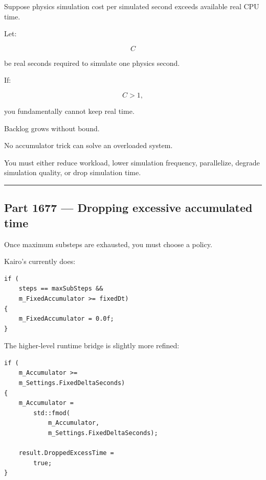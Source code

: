 \hypertarget{06-engine-ii-ch037-the-mathematical-condition}{}

Suppose physics simulation cost per simulated second exceeds available real CPU time.

Let:

\[
C
\]

be real seconds required to simulate one physics second.

If:

\[
C>1,
\]

you fundamentally cannot keep real time.

Backlog grows without bound.

No accumulator trick can solve an overloaded system.

You must either reduce workload, lower simulation frequency, parallelize, degrade simulation quality, or drop simulation time.

\begin{center}\rule{0.5\linewidth}{0.5pt}\end{center}

\subsection{Part 1677 --- Dropping excessive accumulated time}\label{06-engine-ii-ch037-part-1677-dropping-excessive-accumulated-time}

\hypertarget{06-engine-ii-ch037-part-1677-dropping-excessive-accumulated-time}{}

Once maximum substeps are exhausted, you must choose a policy.

Kairo's  currently does:

\begin{verbatim}
if (
    steps == maxSubSteps &&
    m_FixedAccumulator >= fixedDt)
{
    m_FixedAccumulator = 0.0f;
}
\end{verbatim}

The higher-level runtime bridge is slightly more refined:

\begin{verbatim}
if (
    m_Accumulator >=
    m_Settings.FixedDeltaSeconds)
{
    m_Accumulator =
        std::fmod(
            m_Accumulator,
            m_Settings.FixedDeltaSeconds);

    result.DroppedExcessTime =
        true;
}
\end{verbatim}


